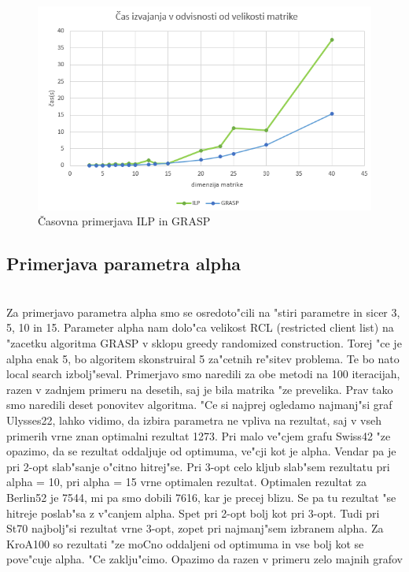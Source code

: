 \documentclass[12pt,a4paper]{amsart}
\theoremstyle{definition} %
\theoremstyle{plain} %
\begin{document}
\begin{figure}[h]
\caption{Časovna primerjava ILP in GRASP}
\centering
\includegraphics[scale =0.8]{casilp}
\end{figure}


\subsection{Primerjava parametra alpha} ~\\
Za primerjavo parametra alpha smo se osredoto"cili na "stiri parametre in sicer 3, 5, 10 in 15. Parameter alpha nam dolo"ca velikost RCL (restricted client list) na "zacetku algoritma GRASP v sklopu greedy randomized construction. Torej "ce je alpha enak 5, bo algoritem skonstruiral 5 za"cetnih re"sitev problema. Te bo nato local search izbolj"seval. Primerjavo smo naredili za obe metodi na 100 iteracijah, razen v zadnjem primeru na desetih, saj je bila matrika "ze prevelika. Prav tako smo naredili deset ponovitev algoritma.
"Ce si najprej ogledamo najmanj"si graf Ulysses22, lahko vidimo, da izbira parametra ne vpliva na rezultat, saj v vseh primerih vrne  znan optimalni rezultat 1273. Pri malo ve"cjem grafu Swiss42 "ze opazimo, da se rezultat oddaljuje od optimuma, ve"cji kot je alpha. Vendar pa je pri 2-opt slab"sanje o"citno hitrej"se. Pri 3-opt celo kljub slab"sem rezultatu pri alpha = 10, pri alpha = 15 vrne optimalen rezultat. Optimalen rezultat za Berlin52 je 7544, mi pa smo dobili 7616, kar je precej blizu. Se pa tu rezultat "se hitreje poslab"sa z v"canjem alpha. Spet pri 2-opt bolj kot pri 3-opt. Tudi pri St70 najbolj"si rezultat vrne 3-opt, zopet pri najmanj"sem izbranem alpha. 
Za KroA100 so rezultati "ze moCno oddaljeni od optimuma in vse bolj kot se pove"cuje alpha. 
"Ce zaklju"cimo. Opazimo da razen v primeru zelo majnih grafov
\end{document}
